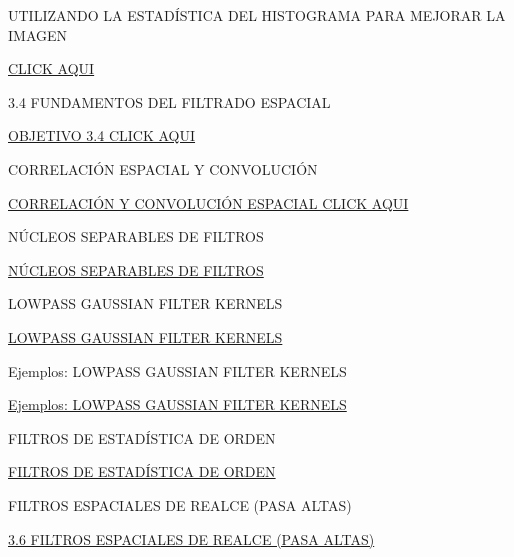 \documentclass{beamer}
\begin{document}
\begin{frame}[fragile]{UTILIZANDO LA ESTADÍSTICA DEL HISTOGRAMA PARA MEJORAR LA IMAGEN}

\href{Tema_pag_150_p1.html}{CLICK AQUI}

\end{frame}


\begin{frame}[fragile]{3.4 FUNDAMENTOS DEL FILTRADO ESPACIAL}

\href{Tema_3_4_p1.html}{OBJETIVO 3.4 CLICK AQUI}

\end{frame}

\begin{frame}[fragile]{CORRELACIÓN ESPACIAL Y CONVOLUCIÓN}

\href{Tema_3_4_pag_154_p1.html}{CORRELACIÓN Y CONVOLUCIÓN ESPACIAL CLICK AQUI}

\end{frame}

\begin{frame}[fragile]{NÚCLEOS SEPARABLES DE FILTROS}

\href{Tema_3_4_pag_161_p1.html}{NÚCLEOS SEPARABLES DE FILTROS}

\end{frame}


\begin{frame}[fragile]{LOWPASS GAUSSIAN FILTER KERNELS}

\href{Tema_3_4_pag_166_p1.html}{LOWPASS GAUSSIAN FILTER KERNELS}

\end{frame}

\begin{frame}[fragile]{Ejemplos: LOWPASS GAUSSIAN FILTER KERNELS}

\href{Tema_3_4_pag_169_p1.html}{Ejemplos: LOWPASS GAUSSIAN FILTER KERNELS}

\end{frame}

\begin{frame}[fragile]{FILTROS DE ESTADÍSTICA DE ORDEN}

\href{Tema_3_4_pag_174_p1.html}{FILTROS DE ESTADÍSTICA DE ORDEN}

\end{frame}

\begin{frame}[fragile]{FILTROS ESPACIALES DE REALCE (PASA ALTAS)}

\href{Tema_3_6_p1.html}{3.6 FILTROS ESPACIALES DE REALCE (PASA ALTAS)}

\end{frame}
\end{document}
